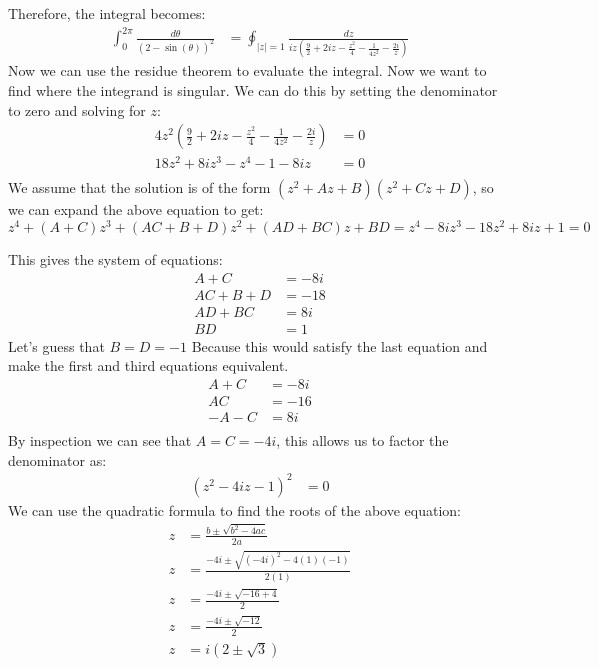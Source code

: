 \begin{example}
    Therefore, the integral becomes:
    \begin{align*}
        \int_0^{2\pi}\frac{d\theta}{(2-\sin(\theta))^2} & = \oint_{|z|=1} \frac{dz}{iz(\frac{9}{2} +2iz - \frac{z^2}{4} - \frac{1}{4z^2} - \frac{2i}{z})}
    \end{align*}
    Now we can use the residue theorem to evaluate the integral. Now we want to find where the integrand is singular. We can do this by setting the denominator to zero and solving for $z$:
    \begin{align*}
        4z^2(\frac{9}{2} +2iz - \frac{z^2}{4} - \frac{1}{4z^2} - \frac{2i}{z}) & = 0 \\
        18z^2 + 8iz^3 - z^4 - 1 - 8iz                                          & = 0 \\
    \end{align*}
    We assume that the solution is of the form $(z^2 +Az + B)(z^2 + Cz + D)$, so we can expand the above equation to get:\\
    $z^4 + (A+C)z^3 + (AC+B+D)z^2 + (AD+BC)z + BD  = z^4 - 8iz^3 - 18z^2 + 8iz  + 1 = 0$

    This gives the system of equations:
    \begin{align*}
        A+C    & = -8i \\
        AC+B+D & = -18 \\
        AD+BC  & = 8i  \\
        BD     & = 1
    \end{align*}
    Let's guess that $B = D = -1$ Because this would satisfy the last equation and make the first and third equations equivalent.
    \begin{align*}
        A+C    & = -8i \\
        AC     & = -16 \\
        -A - C & = 8i  \\
    \end{align*}
    By inspection we can see that $A = C = -4i$, this allows us to factor the denominator as:
    \begin{align*}
        (z^2 - 4iz - 1)^2 & = 0
    \end{align*}
    We can use the quadratic formula to find the roots of the above equation:
    \begin{align*}
        z & = \frac{b\pm\sqrt{b^2-4ac}}{2a}              \\
        z & = \frac{-4i\pm\sqrt{(-4i)^2-4(1)(-1)}}{2(1)} \\
        z & = \frac{-4i\pm\sqrt{-16+4}}{2}               \\
        z & = \frac{-4i\pm\sqrt{-12}}{2}                 \\
        z & = i(2 \pm \sqrt{3})
    \end{align*}


\end{example}
